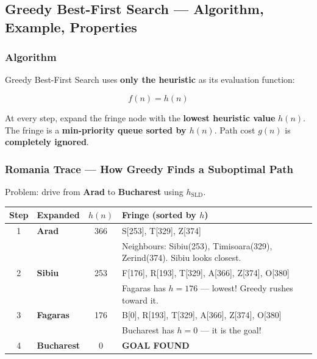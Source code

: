 \documentclass[12pt, a4paper]{article}
\newcommand{\goal}{\textcolor{green!55!black}{\textbf{GOAL FOUND}}}
\begin{document}
\subsection{Greedy Best-First Search — Algorithm, Example, Properties}

\subsubsection*{Algorithm}

\noindent Greedy Best-First Search uses \textbf{only the heuristic} as its evaluation function:

\[
\boxed{f(n) = h(n)}
\]

\vspace{0.3em}
\noindent At every step, expand the fringe node with the \textbf{lowest heuristic value} $h(n)$. The fringe is a \textbf{min-priority queue sorted by $h(n)$}. Path cost $g(n)$ is \textbf{completely ignored}.

\subsubsection*{Romania Trace — How Greedy Finds a Suboptimal Path}

\noindent Problem: drive from \textbf{Arad} to \textbf{Bucharest} using $h_{\text{SLD}}$.

\begin{center}
\renewcommand{\arraystretch}{1.3}
\small
\begin{tabular}{c|l|c|p{8.5cm}}
\toprule
\textbf{Step} & \textbf{Expanded} & $h(n)$ & \textbf{Fringe (sorted by $h$)} \\
\midrule
1 & \textbf{Arad} & 366
  & S[253], T[329], Z[374] \\
  & & & Neighbours: Sibiu(253), Timisoara(329), Zerind(374). Sibiu looks closest. \\
\midrule
2 & \textbf{Sibiu} & 253
  & F[176], R[193], T[329], A[366], Z[374], O[380] \\
  & & & Fagaras has $h{=}176$ — lowest! Greedy rushes toward it. \\
\midrule
3 & \textbf{Fagaras} & 176
  & B[0], R[193], T[329], A[366], Z[374], O[380] \\
  & & & Bucharest has $h{=}0$ — it is the goal! \\
\midrule
4 & \textbf{Bucharest} & 0 & \goal \\
\bottomrule
\end{tabular}
\end{center}
\end{document}
